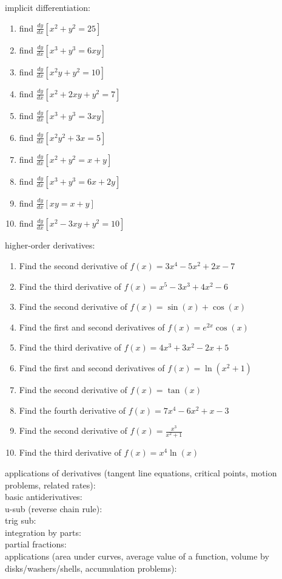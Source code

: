 \documentclass{article}
\begin{document}
implicit differentiation:
\begin{enumerate}
	\item find $\frac{dy}{dx}[x^2 + y^2 = 25]$
	\item find $\frac{dy}{dx}[x^3 + y^3 = 6xy]$
	\item find $\frac{dy}{dx}[x^2y + y^2 = 10]$
	\item find $\frac{dy}{dx}[x^2 + 2xy + y^2 = 7]$
	\item find $\frac{dy}{dx}[x^3 + y^3 = 3xy]$
	\item find $\frac{dy}{dx}[x^2y^2 + 3x = 5]$
	\item find $\frac{dy}{dx}[x^2 + y^2 = x + y]$
	\item find $\frac{dy}{dx}[x^3 + y^3 = 6x + 2y]$
	\item find $\frac{dy}{dx}[xy = x + y]$
	\item find $\frac{dy}{dx}[x^2 - 3xy + y^2 = 10]$
\end{enumerate}

higher-order derivatives:
\begin{enumerate}
        \item Find the second derivative of $f(x) = 3x^4 - 5x^2 + 2x - 7$
        \item Find the third derivative of $f(x) = x^5 - 3x^3 + 4x^2 - 6$
        \item Find the second derivative of $f(x) = \sin(x) + \cos(x)$
        \item Find the first and second derivatives of $f(x) = e^{2x} \cos(x)$
        \item Find the third derivative of $f(x) = 4x^3 + 3x^2 - 2x + 5$
        \item Find the first and second derivatives of $f(x) = \ln(x^2 + 1)$
        \item Find the second derivative of $f(x) = \tan(x)$
        \item Find the fourth derivative of $f(x) = 7x^4 - 6x^2 + x - 3$
        \item Find the second derivative of $f(x) = \frac{x^3}{x^2 + 1}$
        \item Find the third derivative of $f(x) = x^4 \ln(x)$
\end{enumerate}

applications of derivatives (tangent line equations, critical points, motion problems, related rates):\\

basic antiderivatives:\\

u-sub (reverse chain rule):\\

trig sub:\\

integration by parts:\\

partial fractions:\\

applications (area under curves, average value of a function, volume by disks/washers/shells, accumulation problems):\\
\end{document}
